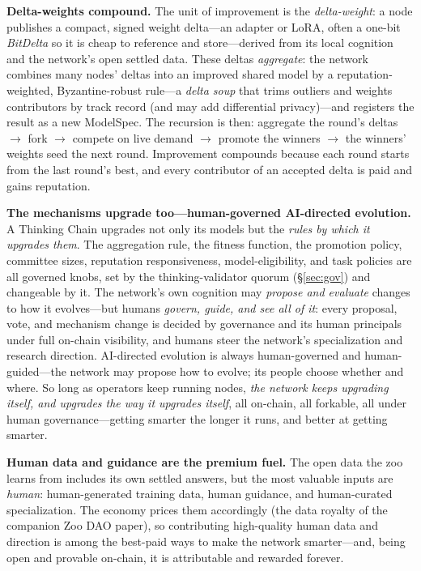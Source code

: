 \documentclass[11pt]{article}
\begin{document}
\medskip\noindent\textbf{Delta-weights compound.} The unit of improvement is the \emph{delta-weight}: a node publishes a compact, signed weight delta---an adapter or LoRA, often a one-bit \emph{BitDelta} so it is cheap to reference and store---derived from its local cognition and the network's open settled data. These deltas \emph{aggregate}: the network combines many nodes' deltas into an improved shared model by a reputation-weighted, Byzantine-robust rule---a \emph{delta soup} that trims outliers and weights contributors by track record (and may add differential privacy)---and registers the result as a new ModelSpec. The recursion is then: aggregate the round's deltas $\to$ fork $\to$ compete on live demand $\to$ promote the winners $\to$ the winners' weights seed the next round. Improvement compounds because each round starts from the last round's best, and every contributor of an accepted delta is paid and gains reputation.

\medskip\noindent\textbf{The mechanisms upgrade too---human-governed AI-directed evolution.} A Thinking Chain upgrades not only its models but the \emph{rules by which it upgrades them}. The aggregation rule, the fitness function, the promotion policy, committee sizes, reputation responsiveness, model-eligibility, and task policies are all governed knobs, set by the thinking-validator quorum (\S\ref{sec:gov}) and changeable by it. The network's own cognition may \emph{propose and evaluate} changes to how it evolves---but humans \emph{govern, guide, and see all of it}: every proposal, vote, and mechanism change is decided by governance and its human principals under full on-chain visibility, and humans steer the network's specialization and research direction. AI-directed evolution is always human-governed and human-guided---the network may propose how to evolve; its people choose whether and where. So long as operators keep running nodes, \emph{the network keeps upgrading itself, and upgrades the way it upgrades itself}, all on-chain, all forkable, all under human governance---getting smarter the longer it runs, and better at getting smarter.

\medskip\noindent\textbf{Human data and guidance are the premium fuel.} The open data the zoo learns from includes its own settled answers, but the most valuable inputs are \emph{human}: human-generated training data, human guidance, and human-curated specialization. The economy prices them accordingly (the data royalty of the companion Zoo DAO paper), so contributing high-quality human data and direction is among the best-paid ways to make the network smarter---and, being open and provable on-chain, it is attributable and rewarded forever.
\end{document}
